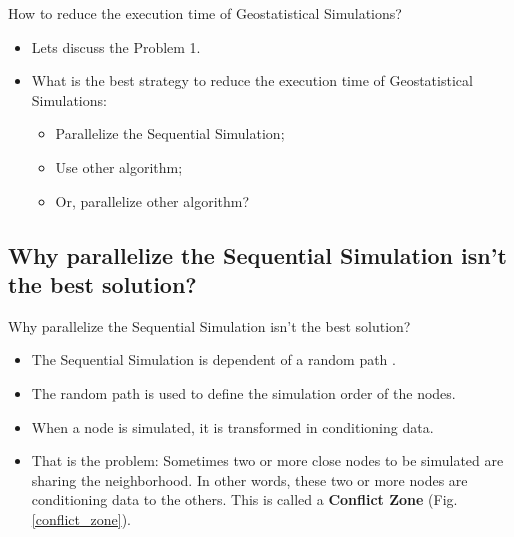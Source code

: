 \begin{frame}{How to reduce the execution time of Geostatistical Simulations?}
	\begin{itemize}
    	\item Lets discuss the Problem 1.
        \item What is the best strategy to reduce the execution time of Geostatistical Simulations:
        \begin{itemize}
        	\item Parallelize the Sequential Simulation;
        	\item Use other algorithm;
        	\item Or, parallelize other algorithm?
        \end{itemize}
    \end{itemize}
\end{frame}

\subsection{Why parallelize the Sequential Simulation isn't the best solution?}
\begin{frame}{Why parallelize the Sequential Simulation isn't the best solution?}
	\begin{itemize}
    	\item The Sequential Simulation is dependent of a random path  \cite{goovaerts1997geostatistics}.
        \item The random path is used to define the simulation order of the nodes.
        \item When a node is simulated, it is transformed in conditioning data.
        \item That is the problem: Sometimes two or more close nodes to be simulated are sharing the neighborhood. In other words, these two or more nodes are conditioning data to the others. This is called a \textbf{Conflict Zone} (Fig. \ref{conflict_zone}).
    \end{itemize}
\end{frame}

